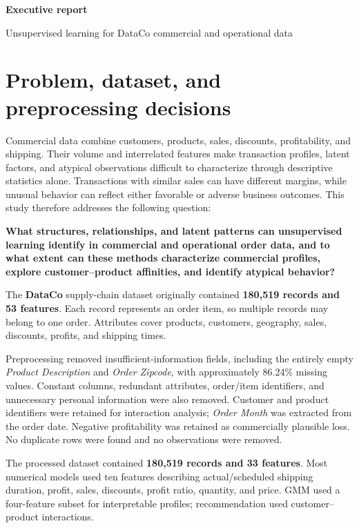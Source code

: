 \documentclass[11pt,a4paper]{article}
\begin{document}
{\LARGE\bfseries\color{azul} Executive report}\par
{\small Unsupervised learning for DataCo commercial and operational data}

\section{Problem, dataset, and preprocessing decisions}
Commercial data combine customers, products, sales, discounts, profitability, and shipping. Their volume and interrelated features make transaction profiles, latent factors, and atypical observations difficult to characterize through descriptive statistics alone. Transactions with similar sales can have different margins, while unusual behavior can reflect either favorable or adverse business outcomes. This study therefore addresses the following question:

\begingroup\leftskip=10pt\rightskip=10pt
\textbf{What structures, relationships, and latent patterns can unsupervised learning identify in commercial and operational order data, and to what extent can these methods characterize commercial profiles, explore customer--product affinities, and identify atypical behavior?}\par
\endgroup

The \textbf{DataCo} supply-chain dataset originally contained \textbf{180,519 records and 53 features}. Each record represents an order item, so multiple records may belong to one order. Attributes cover products, customers, geography, sales, discounts, profits, and shipping times.

Preprocessing removed insufficient-information fields, including the entirely empty \textit{Product Description} and \textit{Order Zipcode}, with approximately 86.24\% missing values. Constant columns, redundant attributes, order/item identifiers, and unnecessary personal information were also removed. Customer and product identifiers were retained for interaction analysis; \textit{Order Month} was extracted from the order date. Negative profitability was retained as commercially plausible loss. No duplicate rows were found and no observations were removed.

The processed dataset contained \textbf{180,519 records and 33 features}. Most numerical models used ten features describing actual/scheduled shipping duration, profit, sales, discounts, profit ratio, quantity, and price. GMM used a four-feature subset for interpretable profiles; recommendation used customer--product interactions.
\end{document}
